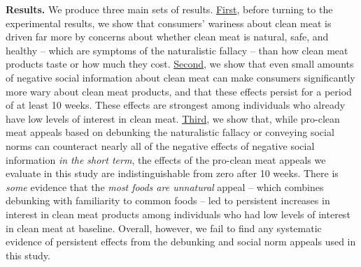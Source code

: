 \documentclass[12pt]{article}
\begin{document}

\textbf{Results.} We produce three main sets of results.
\underline{First}, before turning to the experimental results, we show that consumers' wariness about clean meat is driven far more by concerns about whether clean meat is natural, safe, and healthy -- which are symptoms of the naturalistic fallacy -- than how clean meat products taste or how much they cost.
\underline{Second}, we show that even small amounts of negative social information about clean meat can make consumers significantly more wary about clean meat products, and that these effects persist for a period of at least 10 weeks. These effects are strongest among individuals who already have low levels of interest in clean meat.
\underline{Third}, we show that, while pro-clean meat appeals based on debunking the naturalistic fallacy or conveying social norms can counteract nearly all of the negative effects of negative social information \textit{in the short term}, the effects of the pro-clean meat appeals we evaluate in this study are indistinguishable from zero after 10 weeks. There is \textit{some} evidence that the \textit{most foods are unnatural} appeal -- which combines debunking with familiarity to common foods -- led to persistent increases in interest in clean meat products among individuals who had low levels of interest in clean meat at baseline. Overall, however, we fail to find any systematic evidence of persistent effects from the debunking and social norm appeals used in this study.
\end{document}
